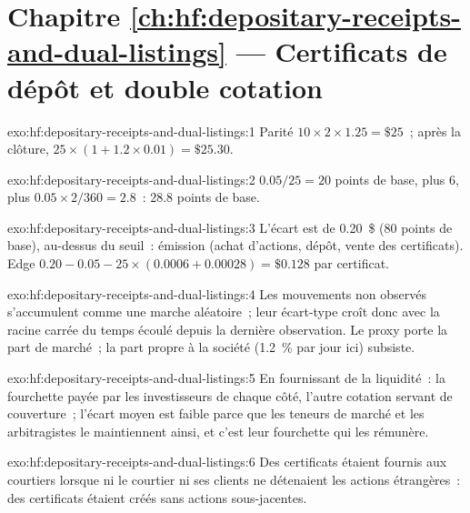 \section*{Chapitre \ref{ch:hf:depositary-receipts-and-dual-listings} --- Certificats de dépôt et double cotation}

\begin{solution}{exo:hf:depositary-receipts-and-dual-listings:1}
Parité $10\times2\times1.25=\$25$~; après la clôture, $25\times(1+1.2\times0.01)=\$25.30$.
\end{solution}

\begin{solution}{exo:hf:depositary-receipts-and-dual-listings:2}
$0.05/25=20$ points de base, plus 6, plus $0.05\times2/360=2.8$~: 28.8 points de base.
\end{solution}

\begin{solution}{exo:hf:depositary-receipts-and-dual-listings:3}
L'écart est de 0.20~\$ (80 points de base), au-dessus du seuil~: émission (achat d'actions, dépôt, vente des certificats). Edge $0.20-0.05-25\times(0.0006+0.00028)=\$0.128$
par certificat.
\end{solution}

\begin{solution}{exo:hf:depositary-receipts-and-dual-listings:4}
Les mouvements non observés s'accumulent comme une marche aléatoire~; leur écart-type croît donc avec la racine carrée du temps écoulé depuis la dernière observation. Le
proxy porte la part de marché~; la part propre à la société (1.2~\% par jour ici) subsiste.
\end{solution}

\begin{solution}{exo:hf:depositary-receipts-and-dual-listings:5}
En fournissant de la liquidité~: la fourchette payée par les investisseurs de chaque côté, l'autre cotation servant de couverture~; l'écart moyen est faible parce que les teneurs
de marché et les arbitragistes le maintiennent ainsi, et c'est leur fourchette qui les rémunère.
\end{solution}

\begin{solution}{exo:hf:depositary-receipts-and-dual-listings:6}
Des certificats étaient fournis aux courtiers lorsque ni le courtier ni ses clients ne détenaient les actions étrangères~: des certificats étaient créés sans
actions sous-jacentes.
\end{solution}

